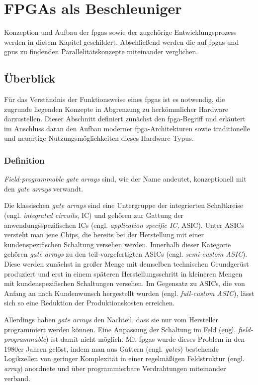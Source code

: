\chapter{FPGAs als Beschleuniger}

Konzeption und Aufbau der \gls{fpga}s sowie der zugehörige Entwicklungsprozess
werden in diesem Kapitel geschildert. Abschließend werden die auf \gls{fpga}s
und \gls{gpu}s zu findenden Parallelitätskonzepte miteinander verglichen.

\section{Überblick}

Für das Verständnis der Funktionsweise eines \gls{fpga}s ist es notwendig, die
zugrunde liegenden Konzepte in Abgrenzung zu herkömmlicher Hardware
darzustellen. Dieser Abschnitt definiert zunächst den \gls{fpga}-Begriff und
erläutert im Anschluss daran den Aufbau moderner \gls{fpga}-Architekturen sowie
traditionelle und neuartige Nutzungsmöglichkeiten dieses Hardware-Typus.

\subsection{Definition}

\textit{Field-programmable gate arrays} sind, wie der Name andeutet,
konzeptionell mit den \textit{gate arrays} verwandt.

Die klassischen \textit{gate arrays} sind eine Untergruppe der integrierten
Schaltkreise (engl. \textit{integrated circuits}, IC) und gehören zur Gattung
der anwendungsspezifischen ICs (engl. \textit{application specific IC}, ASIC).
Unter ASICs versteht man jene Chips, die bereits bei der Herstellung mit einer
kundenspezifischen Schaltung versehen werden. Innerhalb dieser Kategorie gehören
\textit{gate arrays} zu den teil-vorgefertigten ASICs (engl.
\textit{semi-custom ASIC}). Diese werden zunächst in großer Menge mit demselben
technischen Grundgerüst produziert und erst in einem späteren
Herstellungsschritt in kleineren Mengen mit kundenspezifischen Schaltungen
versehen. Im Gegensatz zu ASICs, die von Anfang an nach Kundenwunsch hergestellt
wurden (engl. \textit{full-custom ASIC}), lässt sich so eine Reduktion der
Produktionskosten erreichen. \cite[vgl.][123]{kesel2013}

Allerdings haben \textit{gate arrays} den Nachteil, dass sie nur vom Hersteller
programmiert werden können. Eine Anpassung der Schaltung im Feld (engl.
\textit{field-programmable}) ist damit nicht möglich. Mit \gls{fpga}s wurde
dieses Problem in den 1980er Jahren gelöst, indem man aus Gattern
(engl. \textit{gates}) bestehende Logikzellen von geringer Komplexität in einer
regelmäßigen Feldstruktur (engl. \textit{array}) anordnete und über
programmierbare Verdrahtungen miteinander verband.
\cite[vgl.][208]{kesel2013} 

